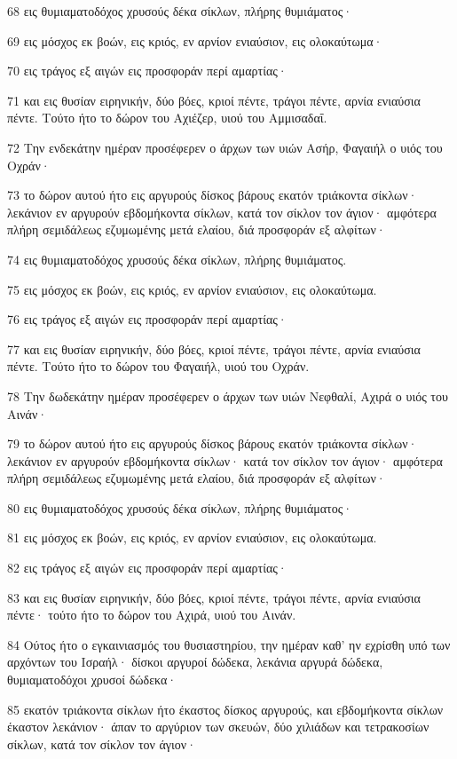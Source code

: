 \par 68 εις θυμιαματοδόχος χρυσούς δέκα σίκλων, πλήρης θυμιάματος·
\par 69 εις μόσχος εκ βοών, εις κριός, εν αρνίον ενιαύσιον, εις ολοκαύτωμα·
\par 70 εις τράγος εξ αιγών εις προσφοράν περί αμαρτίας·
\par 71 και εις θυσίαν ειρηνικήν, δύο βόες, κριοί πέντε, τράγοι πέντε, αρνία ενιαύσια πέντε. Τούτο ήτο το δώρον του Αχιέζερ, υιού του Αμμισαδαΐ.
\par 72 Την ενδεκάτην ημέραν προσέφερεν ο άρχων των υιών Ασήρ, Φαγαιήλ ο υιός του Οχράν·
\par 73 το δώρον αυτού ήτο εις αργυρούς δίσκος βάρους εκατόν τριάκοντα σίκλων· λεκάνιον εν αργυρούν εβδομήκοντα σίκλων, κατά τον σίκλον τον άγιον· αμφότερα πλήρη σεμιδάλεως εζυμωμένης μετά ελαίου, διά προσφοράν εξ αλφίτων·
\par 74 εις θυμιαματοδόχος χρυσούς δέκα σίκλων, πλήρης θυμιάματος.
\par 75 εις μόσχος εκ βοών, εις κριός, εν αρνίον ενιαύσιον, εις ολοκαύτωμα.
\par 76 εις τράγος εξ αιγών εις προσφοράν περί αμαρτίας·
\par 77 και εις θυσίαν ειρηνικήν, δύο βόες, κριοί πέντε, τράγοι πέντε, αρνία ενιαύσια πέντε. Τούτο ήτο το δώρον του Φαγαιήλ, υιού του Οχράν.
\par 78 Την δωδεκάτην ημέραν προσέφερεν ο άρχων των υιών Νεφθαλί, Αχιρά ο υιός του Αινάν·
\par 79 το δώρον αυτού ήτο εις αργυρούς δίσκος βάρους εκατόν τριάκοντα σίκλων· λεκάνιον εν αργυρούν εβδομήκοντα σίκλων· κατά τον σίκλον τον άγιον· αμφότερα πλήρη σεμιδάλεως εζυμωμένης μετά ελαίου, διά προσφοράν εξ αλφίτων·
\par 80 εις θυμιαματοδόχος χρυσούς δέκα σίκλων, πλήρης θυμιάματος·
\par 81 εις μόσχος εκ βοών, εις κριός, εν αρνίον ενιαύσιον, εις ολοκαύτωμα.
\par 82 εις τράγος εξ αιγών εις προσφοράν περί αμαρτίας·
\par 83 και εις θυσίαν ειρηνικήν, δύο βόες, κριοί πέντε, τράγοι πέντε, αρνία ενιαύσια πέντε· τούτο ήτο το δώρον του Αχιρά, υιού του Αινάν.
\par 84 Ούτος ήτο ο εγκαινιασμός του θυσιαστηρίου, την ημέραν καθ' ην εχρίσθη υπό των αρχόντων του Ισραήλ· δίσκοι αργυροί δώδεκα, λεκάνια αργυρά δώδεκα, θυμιαματοδόχοι χρυσοί δώδεκα·
\par 85 εκατόν τριάκοντα σίκλων ήτο έκαστος δίσκος αργυρούς, και εβδομήκοντα σίκλων έκαστον λεκάνιον· άπαν το αργύριον των σκευών, δύο χιλιάδων και τετρακοσίων σίκλων, κατά τον σίκλον τον άγιον·
